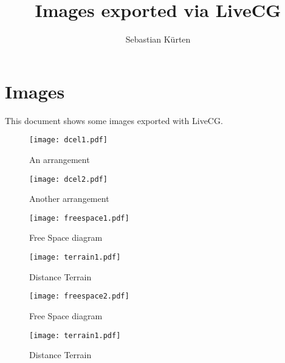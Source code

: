 \documentclass[a4paper,11pt]{article}
\begin{document}

\lstset{
basicstyle=\footnotesize
}

\newcommand{\itye}{\CheckedBox}
\newcommand{\itno}{\Square}


\title{Images exported via LiveCG}
\author{Sebastian Kürten}
\maketitle



\section{Images}

This document shows some images exported with LiveCG.

\begin{figure}[ht]
	\centering
	\texttt{[image: dcel1.pdf]}
	\caption{An arrangement}
	\label{figArrangement1}
\end{figure}

\begin{figure}[ht]
	\centering
	\texttt{[image: dcel2.pdf]}
	\caption{Another arrangement}
	\label{figArrangement2}
\end{figure}

\begin{figure}[ht]
	\centering
	\texttt{[image: freespace1.pdf]}
	\caption{Free Space diagram}
	\label{figFreeSpace1}
\end{figure}

\begin{figure}[ht]
	\centering
	\texttt{[image: terrain1.pdf]}
	\caption{Distance Terrain}
	\label{figDistanceTerrain1}
\end{figure}

\begin{figure}[ht]
	\centering
	\texttt{[image: freespace2.pdf]}
	\caption{Free Space diagram}
	\label{figFreeSpace2}
\end{figure}

\begin{figure}[ht]
	\centering
	\texttt{[image: terrain1.pdf]}
	\caption{Distance Terrain}
	\label{figDistanceTerrain2}
\end{figure}
\end{document}
